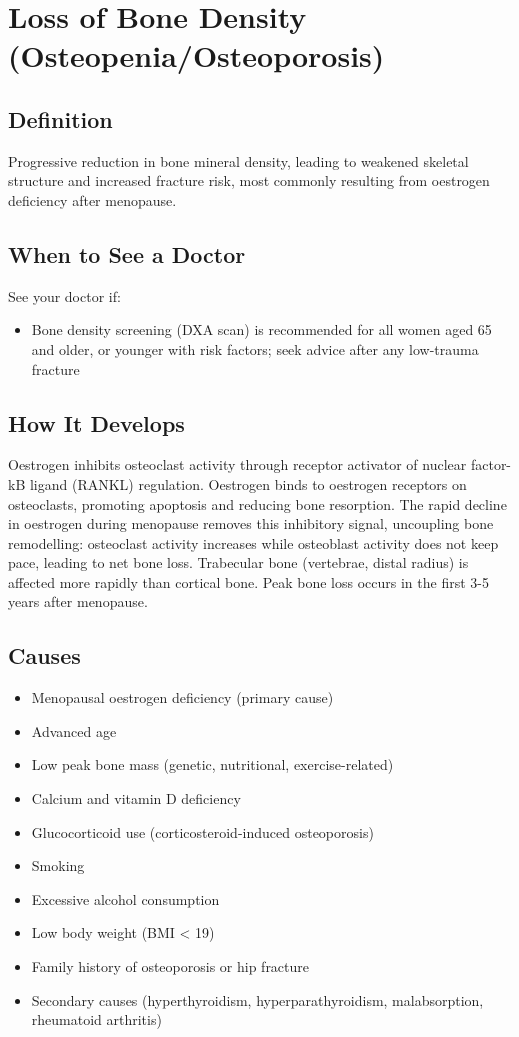 \chapter{Loss of Bone Density (Osteopenia/Osteoporosis)}

\section*{Definition}
Progressive reduction in bone mineral density, leading to weakened skeletal structure and increased fracture risk, most commonly resulting from oestrogen deficiency after menopause.

\section*{When to See a Doctor}
See your doctor if:
\begin{itemize}
  \item Bone density screening (DXA scan) is recommended for all women aged 65 and older, or younger with risk factors; seek advice after any low-trauma fracture
\end{itemize}

\section*{How It Develops}
Oestrogen inhibits osteoclast activity through receptor activator of nuclear factor-kB ligand (RANKL) regulation. Oestrogen binds to oestrogen receptors on osteoclasts, promoting apoptosis and reducing bone resorption. The rapid decline in oestrogen during menopause removes this inhibitory signal, uncoupling bone remodelling: osteoclast activity increases while osteoblast activity does not keep pace, leading to net bone loss. Trabecular bone (vertebrae, distal radius) is affected more rapidly than cortical bone. Peak bone loss occurs in the first 3-5 years after menopause.

\section*{Causes}
\begin{itemize}
  \item Menopausal oestrogen deficiency (primary cause)
  \item Advanced age
  \item Low peak bone mass (genetic, nutritional, exercise-related)
  \item Calcium and vitamin D deficiency
  \item Glucocorticoid use (corticosteroid-induced osteoporosis)
  \item Smoking
  \item Excessive alcohol consumption
  \item Low body weight (BMI < 19)
  \item Family history of osteoporosis or hip fracture
  \item Secondary causes (hyperthyroidism, hyperparathyroidism, malabsorption, rheumatoid arthritis)
\end{itemize}

